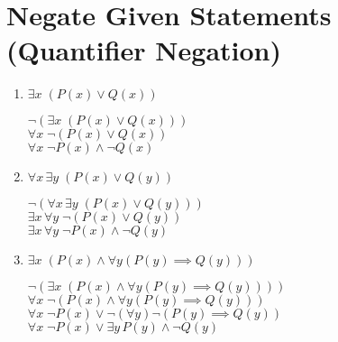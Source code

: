 \documentclass[a4paper]{article}
\begin{document}
\section{Negate Given Statements (Quantifier Negation)}
\begin{enumerate}
    \item \boldmath $\exists x \; (P(x) \lor Q(x))$ \unboldmath
    
    $\neg(\exists x \; (P(x) \lor Q(x)))$ \\
    $\forall x \; \neg (P(x) \lor Q(x))$ \\
    $\forall x \; \neg P(x) \land \neg Q(x)$
    
    \item \boldmath $\forall x \, \exists y \; (P(x) \lor Q(y))$ \unboldmath
    
    $\neg(\forall x \, \exists y \; (P(x) \lor Q(y)))$ \\
    $\exists x \, \forall y \; \neg (P(x) \lor Q(y))$ \\
    $\exists x \, \forall y \; \neg P(x) \land \neg Q(y)$ 
    
    \item \boldmath $\exists x \; (P(x) \land \forall y (P(y) \implies Q(y)))$ \unboldmath 
    
    $\neg (\exists x \; (P(x) \land \forall y (P(y) \implies Q(y))))$ \\
    $\forall x \; \neg (P(x) \land \forall y (P(y) \implies Q(y)))$ \\
    $\forall x \; \neg P(x) \lor \neg(\forall y) \neg (P(y) \implies Q(y))$ \\
    $\forall x \; \neg P(x) \lor \exists y \, P(y) \land \neg Q(y)$
\end{enumerate}

\bigskip %
\end{document}

